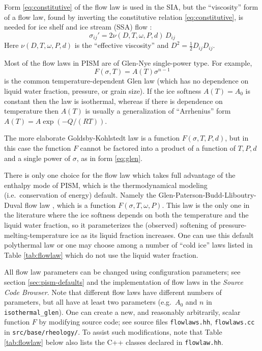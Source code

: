 Form \eqref{eq:constitutive} of the flow law is used in the SIA, but the ``viscosity'' form of a flow law, found by inverting the constitutive relation \eqref{eq:constitutive}, is needed for ice shelf and ice stream (SSA) flow \cite{BBssasliding}:
\begin{equation}
\sigma_{ij}' = 2 \nu(D,T,\omega,P,d)\,D_{ij}  \label{eq:viscosityform}
\end{equation}
Here $\nu(D,T,\omega,P,d)$ is the ``effective viscosity'' and $D^2 = \frac{1}{2} D_{ij} D_{ij}$.

Most of the flow laws in PISM are of Glen-Nye single-power type.  For example,
\begin{equation}
F(\sigma,T) = A(T) \sigma^{n-1}  \label{eq:glen}
\end{equation}
is the common temperature-dependent Glen law \cite{PatersonBudd,BBL} (which has no dependence on liquid water fraction, pressure, or grain size).  If the ice softness $A(T)=A_0$ is constant then the law is isothermal, whereas if there is dependence on temperature then $A(T)$ is usually a generalization of ``Arrhenius'' form $A(T) = A \exp(-Q/(R T))$.

The more elaborate Goldsby-Kohlstedt law \cite{GoldsbyKohlstedt} is a function $F(\sigma,T,P,d)$, but in this case the function $F$ cannot be factored into a product of a function of $T,P,d$ and a single power of $\sigma$, as in form \eqref{eq:glen}.

There is only one choice for the flow law which takes full advantage of the enthalpy mode of PISM, which is the thermodynamical modeling (i.e.~conservation of energy) default.  Namely the Glen-Paterson-Budd-Lliboutry-Duval flow law \cite{AschwandenBuelerKhroulevBlatter,LliboutryDuval1985,PatersonBudd}, which is a function $F(\sigma,T,\omega,P)$.  This law is the only one in the literature where the ice softness depends on both the temperature and the liquid water fraction, so it parameterizes the (observed) softening of pressure-melting-temperature ice as its liquid fraction increases.  One can use this default polythermal law or one may choose among a number of ``cold ice'' laws listed in Table \ref{tab:flowlaw} which do not use the liquid water fraction.  

All flow law parameters can be changed using configuration parameters; see section \ref{sec:pism-defaults} and the implementation of flow laws in the \emph{Source Code Browser}.  Note that different flow laws have different numbers of parameters, but all have at least two parameters (e.g.~$A_0$ and $n$ in \texttt{isothermal_glen}).  One can create a new, and reasonably arbitrarily, scalar function $F$ by modifying source code; see source files \texttt{flowlaws.hh}, \texttt{flowlaws.cc} in \texttt{src/base/rheology/}.  To assist such modifications, note that Table \ref{tab:flowlaw} below also lists the C++ classes declared in \texttt{flowlaw.hh}.

